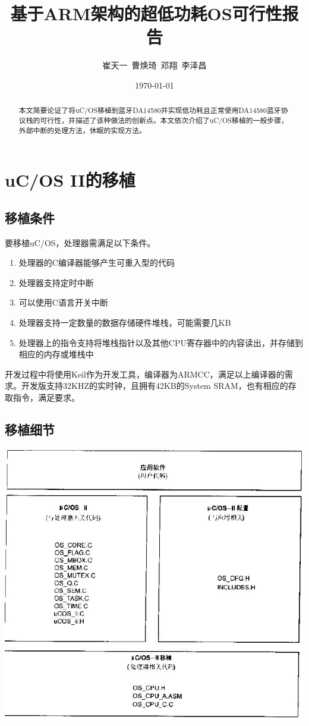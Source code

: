 \documentclass{ctexart}
\begin{document}
\title{基于ARM架构的超低功耗OS可行性报告}
\author{崔天一\ 曹焕琦\ 邓翔\ 李泽昌}
\date{\today}
\maketitle
\thispagestyle{empty}
\begin{abstract}
 本文简要论证了将uC/OS移植到蓝牙DA14580并实现低功耗且正常使用DA14580蓝牙协议栈的可行性，并描述了该种做法的创新点。本文依次介绍了uC/OS移植的一般步骤，外部中断的处理方法，休眠的实现方法。
\end{abstract}

\newpage
\thispagestyle{empty}
\tableofcontents
\newpage
\setcounter{page}{1}
\section{uC/OS II的移植\cite{001}}
\subsection{移植条件}
要移植uC/OS，处理器需满足以下条件。
\begin{enumerate}
\item 处理器的C编译器能够产生可重入型的代码
\item 处理器支持定时中断
\item 可以使用C语言开关中断
\item 处理器支持一定数量的数据存储硬件堆栈，可能需要几KB
\item 处理器上的指令支持将堆栈指针以及其他CPU寄存器中的内容读出，并存储到相应的内存或堆栈中
\end{enumerate}

开发过程中将使用Keil作为开发工具，编译器为ARMCC，满足以上编译器的需求。开发版支持32KHZ的实时钟，且拥有42KB的System SRAM，也有相应的存取指令，满足要求。
\subsection{移植细节}

\centerline{\includegraphics[scale=0.65]{001}}\par
\end{document}

